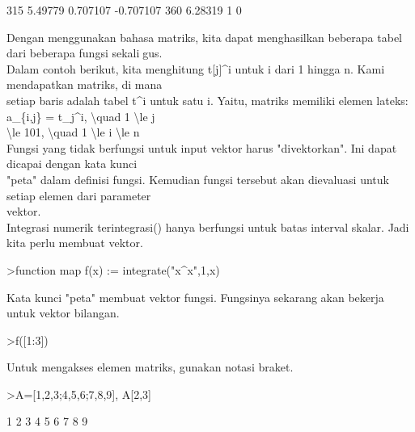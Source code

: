 \documentclass[a4paper,10pt]{article}
\begin{document}
\begin{eulernotebook}
\begin{eulercomment}
\begin{eulercomment}
\begin{eulercomment}
\begin{eulercomment}
\begin{euleroutput}
            315       5.49779      0.707107     -0.707107 
            360       6.28319             1             0 
\end{euleroutput}
\begin{eulercomment}
Dengan menggunakan bahasa matriks, kita dapat menghasilkan beberapa
tabel dari beberapa fungsi sekaligus.\\
Dalam contoh berikut, kita menghitung t[j]\textasciicircum{}i untuk i dari 1 hingga n.
Kami mendapatkan matriks, di mana\\
setiap baris adalah tabel t\textasciicircum{}i untuk satu i. Yaitu, matriks memiliki
elemen lateks: a\_\{i,j\} = t\_j\textasciicircum{}i, \textbackslash{}quad 1 \textbackslash{}le j\\
\textbackslash{}le 101, \textbackslash{}quad 1 \textbackslash{}le i \textbackslash{}le n\\
Fungsi yang tidak berfungsi untuk input vektor harus "divektorkan".
Ini dapat dicapai dengan kata kunci\\
"peta" dalam definisi fungsi. Kemudian fungsi tersebut akan dievaluasi
untuk setiap elemen dari parameter\\
vektor.\\
Integrasi numerik terintegrasi() hanya berfungsi untuk batas interval
skalar. Jadi kita perlu membuat vektor.
\end{eulercomment}
\begin{eulerprompt}
>function map f(x) := integrate("x^x",1,x)
\end{eulerprompt}
\begin{eulercomment}
Kata kunci "peta" membuat vektor fungsi. Fungsinya sekarang akan
bekerja untuk vektor bilangan.
\end{eulercomment}
\begin{eulerprompt}
>f([1:3])
\end{eulerprompt}
\begin{euleroutput}
  [0,  2.05045,  13.7251]
\end{euleroutput}
\begin{eulercomment}
Untuk mengakses elemen matriks, gunakan notasi braket.
\end{eulercomment}
\begin{eulerprompt}
>A=[1,2,3;4,5,6;7,8,9], A[2,3]
\end{eulerprompt}
\begin{euleroutput}
              1             2             3 
              4             5             6 
              7             8             9 

\end{euleroutput}
\end{eulercomment}
\end{eulercomment}
\end{eulercomment}
\end{eulercomment}
\end{eulernotebook}
\end{document}
